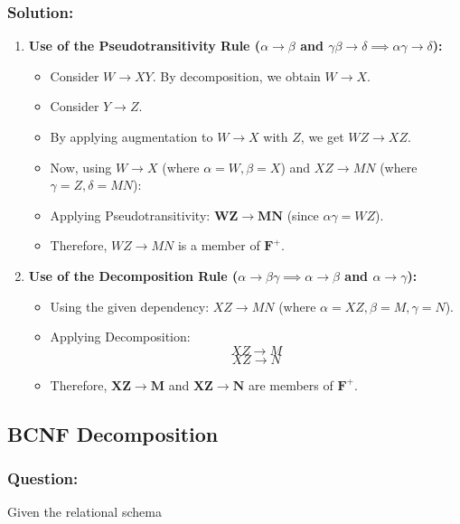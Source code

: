 \documentclass{article}
\begin{document}
\subsubsection*{Solution:}
   \begin{enumerate}
       \item \textbf{Use of the Pseudotransitivity Rule ($\alpha \rightarrow \beta$ and $\gamma\beta \rightarrow \delta \implies \alpha\gamma \rightarrow \delta$):}
       \begin{itemize}
           \item Consider $W \rightarrow XY$. By decomposition, we obtain $W \rightarrow X$.
           \item Consider $Y \rightarrow Z$.
           \item By applying augmentation to $W \rightarrow X$ with $Z$, we get $WZ \rightarrow XZ$.
           \item Now, using $W \rightarrow X$ (where $\alpha=W, \beta=X$) and $XZ \rightarrow MN$ (where $\gamma=Z, \delta=MN$):
           \item Applying Pseudotransitivity: $\mathbf{WZ \rightarrow MN}$ (since $\alpha\gamma = WZ$).
           \item Therefore, $WZ \rightarrow MN$ is a member of $\mathbf{F^+}$.
       \end{itemize}

       \item \textbf{Use of the Decomposition Rule ($\alpha \rightarrow \beta\gamma \implies \alpha \rightarrow \beta$ and $\alpha \rightarrow \gamma$):}
       \begin{itemize}
           \item Using the given dependency: $XZ \rightarrow MN$ (where $\alpha=XZ, \beta=M, \gamma=N$).
           \item Applying Decomposition:
           $$XZ \rightarrow M$$
           $$XZ \rightarrow N$$
           \item Therefore, $\mathbf{XZ \rightarrow M}$ and $\mathbf{XZ \rightarrow N}$ are members of $\mathbf{F^+}$.
       \end{itemize}
   \end{enumerate}

\subsection{BCNF Decomposition}

\subsubsection*{Question:}
Given the relational schema
\end{document}
